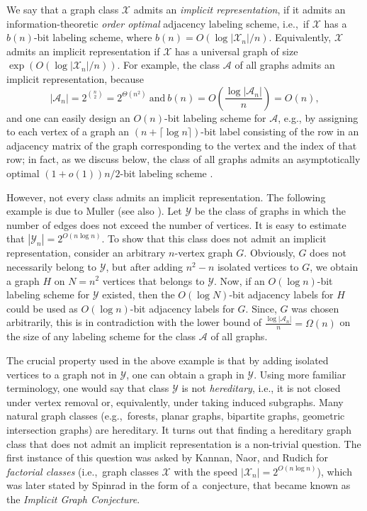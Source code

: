 \documentclass[letterpaper,11pt]{article}
\newcommand{\Ac}{\mathcal{A}}
\newcommand{\Xc}{\mathcal{X}}
\newcommand{\Yc}{\mathcal{Y}}
\theoremstyle{definition}
\theoremstyle{remark}
\begin{document}
	We say that a graph class $\Xc$ admits an \emph{implicit representation}, if it admits an information-theoretic \emph{order optimal} adjacency labeling scheme, i.e.,\ if $\Xc$ has
	a $b(n)$-bit labeling scheme, where $b(n) = O(\log |\Xc_n|/n)$. 
	Equivalently, $\Xc$ admits an implicit representation if $\Xc$ has a universal graph of size $\exp(O(\log |\Xc_n|/n))$.
	For example, the class $\Ac$ of all graphs admits an implicit representation, because
        \[|\Ac_n| = 2^{\binom{n}{2}} = 2^{\Theta(n^2)}~\text{and}~b(n) = O\left(\frac{\log |\Ac_n|}{n}\right) = O(n),\]
        and one can easily design an $O(n)$-bit labeling scheme for $\Ac$, e.g., by assigning to each vertex of a graph an $(n + \lceil \log n \rceil)$-bit label consisting of the row in an adjacency matrix of the graph corresponding to the vertex and the index of that row; in fact, as we discuss below, the class of all graphs admits an asymptotically optimal $(1+o(1))n/2$-bit labeling scheme \cite{A17}.
	
	However, not every class admits an implicit representation. The following example is due to Muller \cite{Muller88} (see also \cite{Spinrad03}). Let $\Yc$ be the class of graphs in which the number of edges
	does not exceed the number of vertices. It is easy to estimate that $|\Yc_n| = 2^{O(n \log n)}$. To show that this class
	does not admit an implicit representation, consider an arbitrary $n$-vertex graph $G$. Obviously, $G$ does not necessarily belong to $\Yc$, but after adding $n^2-n$ isolated vertices to $G$, we obtain a graph $H$ on $N=n^2$ vertices that belongs to $\Yc$.
	Now, if an $O(\log n)$-bit labeling scheme for $\Yc$ existed, then the $O(\log N)$-bit adjacency labels for $H$ could be used
	as $O(\log n)$-bit adjacency labels for $G$. Since, $G$ was chosen arbitrarily, this is in contradiction with the lower bound of 
	$\frac{\log |\Ac_n|}{n} = \Omega(n)$ on the size of any labeling scheme for the class $\Ac$ of all graphs.
	
	The crucial property used in the above example is that by adding isolated vertices to a graph not in $\Yc$, one can obtain a graph in $\Yc$.
	Using more familiar terminology, one would say that class $\Yc$ is not \emph{hereditary}, i.e., it is not closed under vertex removal or, equivalently, under taking induced subgraphs. Many natural graph classes (e.g.,\ forests, planar graphs, bipartite graphs, geometric intersection graphs) are hereditary. 
	It turns out that finding a hereditary graph class that does not admit an implicit representation is a non-trivial question. The first instance of this question was asked by 	Kannan, Naor, and Rudich \cite{KNR88} for \textit{factorial classes} (i.e.,~graph classes $\mathcal{X}$ with the speed $|\mathcal{X}_n|=2^{O(n\log n )}$), which was later stated by Spinrad \cite{Spinrad03} in the form of a~conjecture, that became known as the \emph{Implicit Graph Conjecture}.
	
\end{document}
